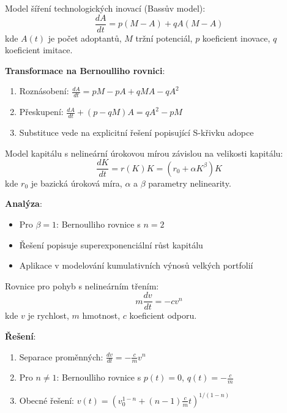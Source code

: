 \begin{application}
\label{app:ekonomicke-difuze}
Model šíření technologických inovací (Bassův model):
\[
\frac{dA}{dt} = p(M - A) + qA(M - A)
\]
kde $A(t)$ je počet adoptantů, $M$ tržní potenciál, $p$ koeficient inovace, $q$ koeficient imitace.

\textbf{Transformace na Bernoulliho rovnici}:
\begin{enumerate}
\item Roznásobení: $\frac{dA}{dt} = pM - pA + qMA - qA^2$
\item Přeskupení: $\frac{dA}{dt} + (p - qM)A = qA^2 - pM$
\item Substituce vede na explicitní řešení popisující S-křivku adopce
\end{enumerate}
\end{application}

\vspace{0.6\baselineskip}

\begin{application}
\label{app:financni-nelinearni-uroceni}
Model kapitálu s nelineární úrokovou mírou závislou na velikosti kapitálu:
\[
\frac{dK}{dt} = r(K)K = (r_0 + \alpha K^\beta)K
\]
kde $r_0$ je bazická úroková míra, $\alpha$ a $\beta$ parametry nelinearity.

\textbf{Analýza}:
\begin{itemize}
\item Pro $\beta = 1$: Bernoulliho rovnice s $n = 2$
\item Řešení popisuje superexponenciální růst kapitálu
\item Aplikace v modelování kumulativních výnosů velkých portfolií
\end{itemize}
\end{application}

\vspace{0.6\baselineskip}

\begin{application}
\label{app:fyzikalni-nelinearni-tlumeni}
Rovnice pro pohyb s nelineárním třením:
\[
m\frac{dv}{dt} = -cv^n
\]
kde $v$ je rychlost, $m$ hmotnost, $c$ koeficient odporu.

\textbf{Řešení}:
\begin{enumerate}
\item Separace proměnných: $\frac{dv}{dt} = -\frac{c}{m}v^n$
\item Pro $n \neq 1$: Bernoulliho rovnice s $p(t) = 0$, $q(t) = -\frac{c}{m}$
\item Obecné řešení: $v(t) = \left(v_0^{1-n} + (n-1)\frac{c}{m}t\right)^{1/(1-n)}$
\end{enumerate}
\end{application}

